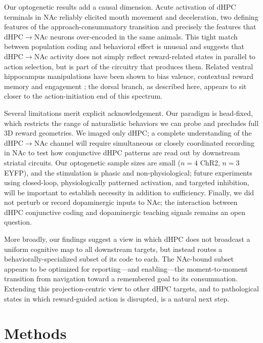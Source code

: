 \documentclass[11pt]{article}
\begin{document}
Our optogenetic results add a causal dimension. Acute activation of dHPC terminals in NAc reliably elicited mouth movement and deceleration, two defining features of the approach-consummatory transition and precisely the features that dHPC$\rightarrow$NAc neurons over-encoded in the same animals. This tight match between population coding and behavioral effect is unusual and suggests that dHPC$\rightarrow$NAc activity does not simply reflect reward-related states in parallel to action selection, but is part of the circuitry that produces them. Related ventral hippocampus manipulations have been shown to bias valence, contextual reward memory and engagement \citep{Ciocchi2015Selective,Nguyen2024Cholecystokinin,Iyer2025Engagement,Bakoyiannis2023Pathway}; the dorsal branch, as described here, appears to sit closer to the action-initiation end of this spectrum.

Several limitations merit explicit acknowledgement. Our paradigm is head-fixed, which restricts the range of naturalistic behaviors we can probe and precludes full 3D reward geometries. We imaged only dHPC; a complete understanding of the dHPC$\rightarrow$NAc channel will require simultaneous or closely coordinated recording in NAc to test how conjunctive dHPC patterns are read out by downstream striatal circuits. Our optogenetic sample sizes are small ($n=4$ ChR2, $n=3$ EYFP), and the stimulation is phasic and non-physiological; future experiments using closed-loop, physiologically patterned activation, and targeted inhibition, will be important to establish necessity in addition to sufficiency. Finally, we did not perturb or record dopaminergic inputs to NAc; the interaction between dHPC conjunctive coding and dopaminergic teaching signals \citep{Mamad2017PlaceField,Jung2024Dopamine} remains an open question.

More broadly, our findings suggest a view in which dHPC does not broadcast a uniform cognitive map to all downstream targets, but instead routes a behaviorally-specialized subset of its code to each. The NAc-bound subset appears to be optimized for reporting---and enabling---the moment-to-moment transition from navigation toward a remembered goal to its consummation. Extending this projection-centric view to other dHPC targets, and to pathological states in which reward-guided action is disrupted, is a natural next step.

\section{Methods}
\end{document}
